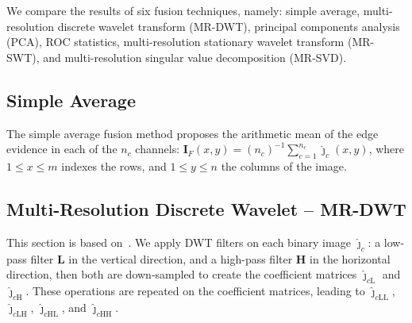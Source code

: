 \documentclass[journal]{IEEEtran}
\begin{document}

We compare the results of six fusion techniques, namely:
simple average, 
multi-resolution discrete wavelet transform (MR-DWT),
principal components analysis (PCA), 
ROC statistics,
multi-resolution stationary wavelet transform (MR-SWT), and
multi-resolution singular value decomposition (MR-SVD).



\subsection{Simple Average}
The simple average fusion method proposes the arithmetic mean of the edge evidence in each of the $n_c$ channels:
$\bm I_F(x,y)=(n_c)^{-1}\sum_{c=1}^{n_c} \widehat{\bm\jmath}_c(x,y)$,
where $1\leq x\leq m$ indexes the rows, and $1\leq y\leq n$ the columns of the image.

\subsection{Multi-Resolution Discrete Wavelet -- MR-DWT} 
This section is based on~\cite{n_r}.
We apply DWT filters on each binary image $\bm{\widehat\jmath}_c$: a low-pass filter $\bm L$ in the vertical direction, and a high-pass filter $\bm H$ in the horizontal direction, then both are down-sampled to create the coefficient matrices $\bm{\widehat\jmath}_{c\text{L}}$ and $\bm{\widehat\jmath}_{c\text{H}}$.
These operations are repeated on the coefficient matrices, leading to $\bm{\widehat\jmath}_{c\text{LL}}$, $\bm{\widehat\jmath}_{c\text{LH}}$, $\bm{\widehat\jmath}_{c\text{HL}}$, and $\bm{\widehat\jmath}_{c\text{HH}}$.
\end{document}
